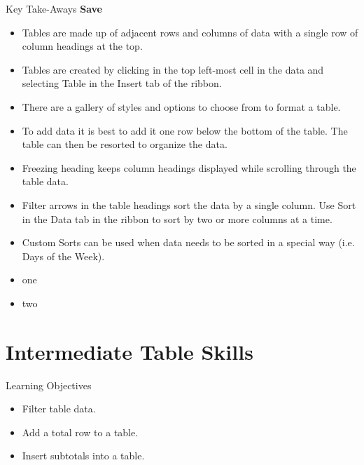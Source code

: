 \begin{center}
	\begin{tkwbox}{Key Take-Aways}
		\textbf{Save}
		\\
		\begin{itemize}
			\setlength{\itemsep}{0pt}
			\setlength{\parskip}{0pt}
			\setlength{\parsep}{0pt}

			\item Tables are made up of adjacent rows and columns of data with a single row of column headings at the top.
			\item Tables are created by clicking in the top left-most cell in the data and selecting Table in the Insert tab of the ribbon.
			\item There are a gallery of styles and options to choose from to format a table.
			\item To add data it is best to add it one row below the bottom of the table. The table can then be resorted to organize the data.
			\item Freezing heading keeps column headings displayed while scrolling through the table data.
			\item Filter arrows in the table headings sort the data by a single column. Use Sort in the Data tab in the ribbon to sort by two or more columns at a time.
			\item Custom Sorts can be used when data needs to be sorted in a special way (i.e. Days of the Week).
			
			\item one
			\item two
			
		\end{itemize}
	\end{tkwbox}
\end{center}



\section{Intermediate Table Skills}


\begin{center}
	\begin{objbox}{Learning Objectives}
		\begin{itemize}
			\setlength{\itemsep}{0pt}
			\setlength{\parskip}{0pt}
			\setlength{\parsep}{0pt}

			\item Filter table data.
			\item Add a total row to a table.
			\item Insert subtotals into a table.
			
		\end{itemize}
	\end{objbox}
\end{center}


